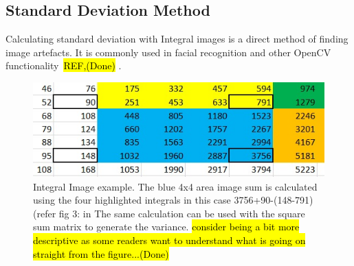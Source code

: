 \documentclass[journal]{IEEEtran}
\begin{document}
\subsection{Standard Deviation Method}
Calculating standard deviation with Integral images is a direct method of finding image artefacts. It is commonly used in facial recognition and other OpenCV functionality~\hl{REF,(Done)} \cite{Viola2004}. 
 \begin{figure}[htbp]
  \centering
  \includegraphics[width=\columnwidth]{Int-SqSum3.jpg}
   \caption{Integral Image example. The blue 4x4 area image sum is calculated using the four highlighted integrals in this case 3756+90-(148-791) (refer fig 3: in \cite{Viola2004} The same calculation can be used with the square sum matrix to generate the variance. \hl{consider being a bit more descriptive as some readers want to understand what is going on straight from the figure...(Done)}}
\label{fig:IntImg}
\end{figure}
\end{document}
